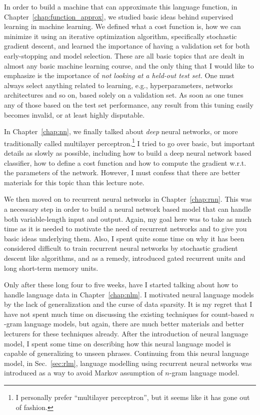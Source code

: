 \documentclass{report}
\begin{document}
In order to build a machine that can approximate this language function, in
Chapter~\ref{chap:function_approx}, we studied basic ideas behind supervised
learning in machine learning. We defined what a cost function is, how we can
minimize it using an iterative optimization algorithm, specifically stochastic
gradient descent, and learned the importance of having a validation set for both
early-stopping and model selection. These are all basic topics that are dealt in
almost any basic machine learning course, and the only thing that I would like
to emphasize is the importance of {\em not looking at a held-out test set.} One
must always select anything related to learning, e.g., hyperparameters, networks
architectures and so on, based solely on a validation set. As soon as one tunes
any of those based on the test set performance, any result from this tuning
easily becomes invalid, or at least highly disputable.

In Chapter~\ref{chap:nn}, we finally talked about {\em deep} neural networks, or
more traditionally called multilayer perceptron.\footnote{
    I personally prefer ``multilayer perceptron'', but it seems like it
    has gone out of fashion.
} I tried to go over basic, but important details as slowly as possible,
including how to build a deep neural network based classifier, how to define a
cost function and how to compute the gradient w.r.t. the parameters of the
network. However, I must confess that there are better materials for this topic
than this lecture note.

We then moved on to recurrent neural networks in Chapter~\ref{chap:rnn}. This
was a necessary step in order to build a neural network based model that can
handle both variable-length input and output. Again, my goal here was to take as
much time as it is needed to motivate the need of recurrent networks and to give
you basic ideas underlying them. Also, I spent quite some time on why it has
been considered difficult to train recurrent neural networks by stochastic
gradient descent like algorithms, and as a remedy, introduced gated recurrent
units and long short-term memory units. 

Only after these long four to five weeks, have I started talking about how to
handle language data in Chapter~\ref{chap:nlm}. I motivated neural language
models by the lack of generalization and the curse of data sparsity. It is my
regret that I have not spent much time on discussing the existing techniques for
count-based $n$-gram language models, but again, there are much better materials
and better lecturers for these techniques already. After the introduction of
neural language model, I spent some time on describing how this neural language
model is capable of generalizing to unseen phrases. Continuing from this neural
language model, in Sec.~\ref{sec:rlm}, language modelling using recurrent neural
networks was introduced as a way to avoid Markov assumption of $n$-gram language
model.
\end{document}
